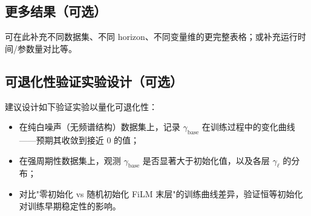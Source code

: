 \subsection{更多结果（可选）}
可在此补充不同数据集、不同 horizon、不同变量维的更完整表格；或补充运行时间/参数量对比等。

\subsection{可退化性验证实验设计（可选）}
建议设计如下验证实验以量化可退化性：
\begin{itemize}
  \item 在纯白噪声（无频谱结构）数据集上，记录 \(\gamma_{\text{base}}\) 在训练过程中的变化曲线——预期其收敛到接近 0 的值；
  \item 在强周期性数据集上，观测 \(\gamma_{\text{base}}\) 是否显著大于初始化值，以及各层 \(\gamma_{\ell}\) 的分布；
  \item 对比"零初始化 vs 随机初始化 FiLM 末层"的训练曲线差异，验证恒等初始化对训练早期稳定性的影响。
\end{itemize}
